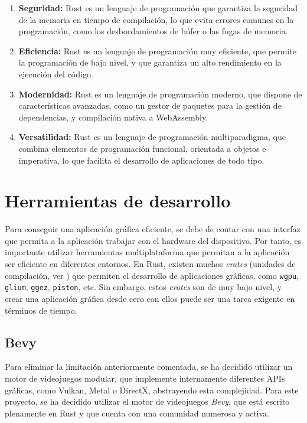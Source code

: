 \begin{enumerate}
    \item \textbf{Seguridad:} Rust es un lenguaje de programación que garantiza la seguridad de la memoria en tiempo de compilación, lo que evita errores comunes en la programación, como los desbordamientos de búfer o las fugas de memoria.
    \item \textbf{Eficiencia:} Rust es un lenguaje de programación muy eficiente, que permite la programación de bajo nivel, y que garantiza un alto rendimiento en la ejecución del código.
    \item \textbf{Modernidad:} Rust es un lenguaje de programación moderno, que dispone de características avanzadas, como un gestor de paquetes para la gestión de dependencias, y compilación nativa a WebAssembly.
    \item \textbf{Versatilidad:} Rust es un lenguaje de programación multiparadigma, que combina elementos de programación funcional, orientada a objetos e imperativa, lo que facilita el desarrollo de aplicaciones de todo tipo.
\end{enumerate}

\section{Herramientas de desarrollo}
\noindent Para conseguir una aplicación gráfica eficiente, se debe de contar con una interfaz que permita a la aplicación trabajar con el hardware del dispositivo. Por tanto, es importante utilizar herramientas multiplataforma que permitan a la aplicación ser eficiente en diferentes entornos. En Rust, existen muchos \textit{crates} (unidades de compilación, ver \autocite{PackagesCratesRust}) que permiten el desarrollo de aplicaciones gráficas, como \texttt{wgpu}, \texttt{glium}, \texttt{ggez}, \texttt{piston}, etc. Sin embargo, estos \textit{crates} son de muy bajo nivel, y crear una aplicación gráfica desde cero con ellos puede ser una tarea exigente en términos de tiempo. 

\subsection{Bevy} \label{subsec:bevy}
\noindent Para eliminar la limitación anteriormente comentada, se ha decidido utilizar un motor de videojuegos modular, que implemente internamente diferentes APIs gráficas, como Vulkan, Metal o DirectX, abstrayendo esta complejidad. Para este proyecto, se ha decidido utilizar el motor de videojuegos \textit{Bevy}, que está escrito plenamente en Rust y que cuenta con una comunidad numerosa y activa.

